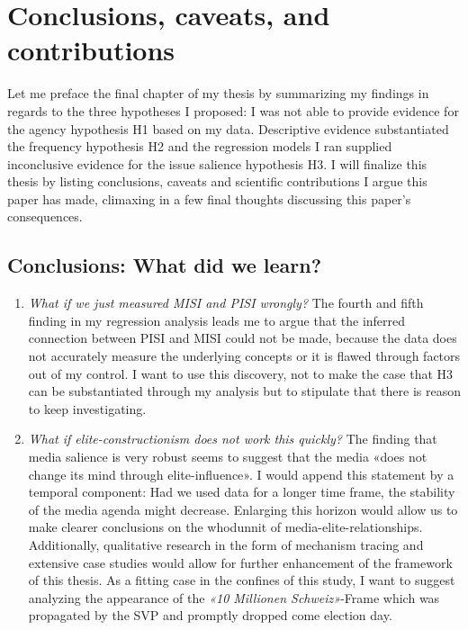 \documentclass[11pt,a4paper]{article}
\begin{document}
\section{Conclusions, caveats, and contributions}
Let me preface the final chapter of my thesis by summarizing my findings in regards to the three hypotheses I proposed: I was not able to provide evidence for the agency hypothesis H1 based on my data. Descriptive evidence substantiated the frequency hypothesis H2 and the regression models I ran supplied inconclusive evidence for the issue salience hypothesis H3. I will finalize this thesis by listing conclusions, caveats and scientific contributions I argue this paper has made, climaxing in a few final thoughts discussing this paper's consequences.


\subsection{Conclusions: What did we learn?}
\begin{enumerate}
    \item \textit{What if we just measured MISI and PISI wrongly?} The fourth and fifth finding in my regression analysis leads me to argue that the inferred connection between PISI and MISI could not be made, because the data does not accurately measure the underlying concepts or it is flawed through factors out of my control. I want to use this discovery, not to make the case that H3 can be substantiated through my analysis but to stipulate that there is reason to keep investigating.
    \item \textit{What if elite-constructionism does not work this quickly?} The finding that media salience is very robust seems to suggest that the media «does not change its mind through elite-influence». I would append this statement by a temporal component: Had we used data for a longer time frame, the stability of the media agenda might decrease. Enlarging this horizon would allow us to make clearer conclusions on the whodunnit of media-elite-relationships. Additionally, qualitative research in the form of mechanism tracing and extensive case studies would allow for further enhancement of the framework of this thesis. As a fitting case in the confines of this study, I want to suggest analyzing the appearance of the \textit{«10 Millionen Schweiz»}-Frame which was propagated by the SVP and promptly dropped come election day. 
\end{enumerate}
\end{document}
